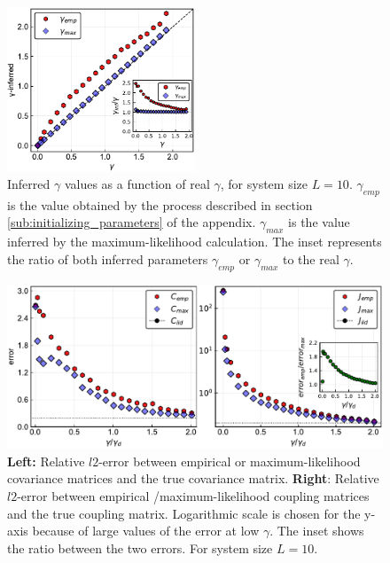 \documentclass[preprint,amsmath,amssymb,superscriptaddress,showpacs,pre]{revtex4-1}
\begin{document}
\begin{figure}[!htb]
	\centering
	\includegraphics[keepaspectratio=true,width=0.5\textwidth]{Figures/scatter_gamma_L10_100.pdf}
	\caption{Inferred $\gamma$ values as a function of real $\gamma$, for system size $L=10$. $\gamma_{emp}$ is the value obtained by the process described in section \ref{sub:initializing_parameters} of the appendix. $\gamma_{max}$ is the value inferred by the maximum-likelihood calculation. 
	The inset represents the ratio of both inferred parameters $\gamma_{emp}$ or $\gamma_{max}$ to the real $\gamma$. }
	\label{fig:scatter_gamma_L10}
\end{figure}


 \begin{figure}[!htb]
 			\centering\includegraphics[keepaspectratio=true,width=1.0\textwidth]{Figures/epsilon_error_L10_balanced_tree_100.pdf}
 		\hspace{1mm}
 	\caption{\textbf{Left:} Relative $l2$-error between empirical or maximum-likelihood covariance matrices and the true covariance matrix. \textbf{Right}: Relative $l2$-error between empirical /maximum-likelihood coupling matrices and the true coupling matrix. Logarithmic scale is chosen for the y-axis because of large values of the error at low $\gamma$. The inset shows the ratio between the two errors. For system size $L=10$.}
 	\label{fig:error_1_L10}
 \end{figure}
\end{document}
